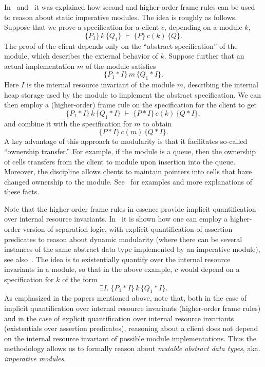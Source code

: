 \documentclass{LMCS}
\newcommand{\ctri}[3]{\{{#1}\}\,{#2}\,\{{#3}\}}
\begin{document}
In~\cite{yang-ohearn-reynolds-popl04}
and~\cite{birkedal-torpsmith-yang-lics05}
it was explained how second and higher-order frame rules can be used
to reason about static imperative modules. The idea is roughly as
follows. Suppose that
we prove a specification for a client $c$, depending
on a module $k$,
$$
   \ctri{P_1}{k}{Q_1} 
   \;\vdash\; \ctri{P}{c(k)}{Q}.
$$
The proof of the client depends only on the ``abstract specification''
of the module, which describes the external behavior of $k$. 
Suppose further that an actual implementation 
$m$ of the module satisfies
$$
    \ctri{P_1 * I}{m}{Q_1 *I}.
$$
Here $I$ is the internal resource invariant of the module $m$, describing
the internal heap storage used by the module  to implement the abstract
specification. We can then employ a (higher-order) frame rule on the specification for the
client to get
$$
  \ctri{P_1 *I}{k}{Q_1*I}
  \;\vdash\; \ctri{P*I}{c(k)}{Q*I},
$$
and combine it with the specification for $m$ to obtain
$$
  \ctri{P*I}{c(m)}{Q*I}.
$$
A key advantage of this approach to modularity is that it facilitates
so-called ``ownership transfer.'' For example, if the module is a queue, 
then the ownership of cells transfers from the client to module upon
insertion into the queue. Moreover, the discipline allows clients to
maintain pointers into cells that have changed ownership to the module. 
See~\cite{yang-ohearn-reynolds-popl04} for examples and more explanations
of these facts.

Note that the higher-order frame rules in essence provide implicit
quantification over internal resource invariants.
In~\cite{biering-birkedal-torpsmith-esop05}
it is shown how one can employ a higher-order version of separation logic,
with explicit quantification of assertion predicates to reason about dynamic
modularity (where there can be several instances of the same abstract data
type implemented by an imperative module), see
also~\cite{parkinson-bierman-popl05}. The idea is to
existentially quantify over the internal resource invariants in
a module, so that in the above example,
$c$ would depend on a specification for $k$ of the form
$$
  \exists I.\; \ctri{P_1 * I}{k}{Q_1 *I}.
$$
As emphasized in the papers mentioned above, note that,
both in the case of implicit quantification over internal resource
invariants (higher-order frame rules) and in the case of explicit
quantification over internal resource invariants (existentials over
assertion predicates), reasoning about a client does not depend on the
internal resource invariant of possible module implementations.
Thus the methodology allows us to formally reason about \emph{mutable
abstract data types}, aka. \emph{imperative modules}.
\end{document}
